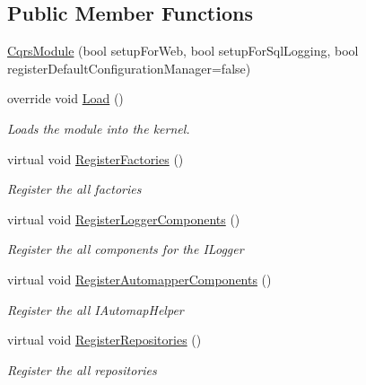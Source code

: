 \subsection*{Public Member Functions}
\begin{DoxyCompactItemize}
\item 
\hyperlink{classCqrs_1_1Ninject_1_1Configuration_1_1CqrsModule_a197055fca498bff31fd9a91a2a07292d_a197055fca498bff31fd9a91a2a07292d}{Cqrs\+Module} (bool setup\+For\+Web, bool setup\+For\+Sql\+Logging, bool register\+Default\+Configuration\+Manager=false)
\item 
override void \hyperlink{classCqrs_1_1Ninject_1_1Configuration_1_1CqrsModule_a8cf4c81c21496699b2f32112b23308fe_a8cf4c81c21496699b2f32112b23308fe}{Load} ()
\begin{DoxyCompactList}\small\item\em Loads the module into the kernel. \end{DoxyCompactList}\item 
virtual void \hyperlink{classCqrs_1_1Ninject_1_1Configuration_1_1CqrsModule_afae0f84460f7cf9d1f9b62ec148b02ad_afae0f84460f7cf9d1f9b62ec148b02ad}{Register\+Factories} ()
\begin{DoxyCompactList}\small\item\em Register the all factories \end{DoxyCompactList}\item 
virtual void \hyperlink{classCqrs_1_1Ninject_1_1Configuration_1_1CqrsModule_a7bb448b4c38d7a4628a30ba709dc8a36_a7bb448b4c38d7a4628a30ba709dc8a36}{Register\+Logger\+Components} ()
\begin{DoxyCompactList}\small\item\em Register the all components for the I\+Logger \end{DoxyCompactList}\item 
virtual void \hyperlink{classCqrs_1_1Ninject_1_1Configuration_1_1CqrsModule_a5c3b6741270b2cb16aa1a1a84c57041b_a5c3b6741270b2cb16aa1a1a84c57041b}{Register\+Automapper\+Components} ()
\begin{DoxyCompactList}\small\item\em Register the all I\+Automap\+Helper \end{DoxyCompactList}\item 
virtual void \hyperlink{classCqrs_1_1Ninject_1_1Configuration_1_1CqrsModule_a3437afb1ea306ff4e65eb2ca22a276d9_a3437afb1ea306ff4e65eb2ca22a276d9}{Register\+Repositories} ()
\begin{DoxyCompactList}\small\item\em Register the all repositories \end{DoxyCompactList}\item 

\end{DoxyCompactItemize}

